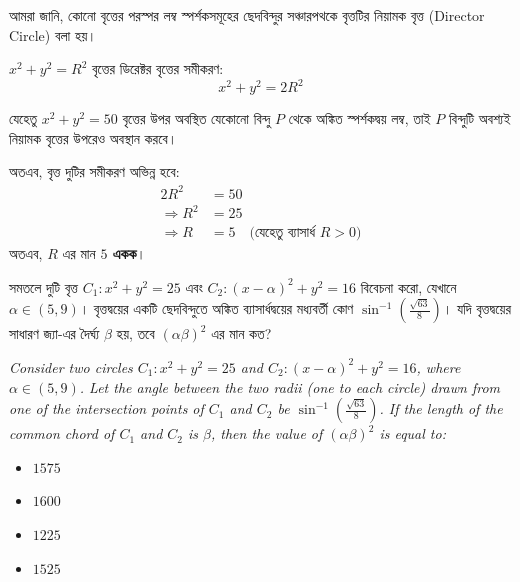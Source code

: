 \documentclass[12pt, a4paper]{article}
\begin{document}
\begin{tcolorbox}[solutionbox={সমাধান (Solution)}]
    \noindent
    আমরা জানি, কোনো বৃত্তের পরস্পর লম্ব স্পর্শকসমূহের ছেদবিন্দুর সঞ্চারপথকে বৃত্তটির নিয়ামক বৃত্ত (Director Circle) বলা হয়।
    
    $x^2 + y^2 = R^2$ বৃত্তের ডিরেক্টর বৃত্তের সমীকরণ: 
    \[ x^2 + y^2 = 2R^2 \]
    
    যেহেতু $x^2 + y^2 = 50$ বৃত্তের উপর অবস্থিত যেকোনো বিন্দু $P$ থেকে অঙ্কিত স্পর্শকদ্বয় লম্ব, তাই $P$ বিন্দুটি অবশ্যই নিয়ামক বৃত্তের উপরেও অবস্থান করবে। 
    
    অতএব, বৃত্ত দুটির সমীকরণ অভিন্ন হবে:
    \begin{align*}
        2R^2 &= 50 \\
        \Rightarrow R^2 &= 25 \\
        \Rightarrow R &= 5 \quad \text{(যেহেতু ব্যাসার্ধ } R > 0\text{)}
    \end{align*}
    অতএব, $R$ এর মান \textbf{$5$ একক}।
\end{tcolorbox}
\begin{tcolorbox}[questionbox={প্রশ্ন (Question) 16}]
    \noindent
    সমতলে দুটি বৃত্ত $C_1: x^2 + y^2 = 25$ এবং $C_2: (x - \alpha)^2 + y^2 = 16$ বিবেচনা করো, যেখানে $\alpha \in (5,9)$। বৃত্তদ্বয়ের একটি ছেদবিন্দুতে অঙ্কিত ব্যাসার্ধদ্বয়ের মধ্যবর্তী কোণ $\sin^{-1}\left(\frac{\sqrt{63}}{8}\right)$। যদি বৃত্তদ্বয়ের সাধারণ জ্যা-এর দৈর্ঘ্য $\beta$ হয়, তবে $(\alpha\beta)^2$ এর মান কত?
    
    \vspace{0.8em}
    \begin{english}
    \noindent\textit{\color{darkgray}
    Consider two circles $C_1: x^2 + y^2 = 25$ and $C_2: (x - \alpha)^2 + y^2 = 16$, where $\alpha \in (5,9)$. Let the angle between the two radii (one to each circle) drawn from one of the intersection points of $C_1$ and $C_2$ be $\sin^{-1}\left(\frac{\sqrt{63}}{8}\right)$. If the length of the common chord of $C_1$ and $C_2$ is $\beta$, then the value of $(\alpha\beta)^2$ is equal to:
    }
    \end{english}
\end{tcolorbox}

\begin{itemize}[label={}, leftmargin=1cm, itemsep=0.5em]
    \item[\textbf{A)}] $1575$
    \item[\textbf{B)}] $1600$
    \item[\textbf{C)}] $1225$
    \item[\textbf{D)}] $1525$
\end{itemize}
\end{document}
